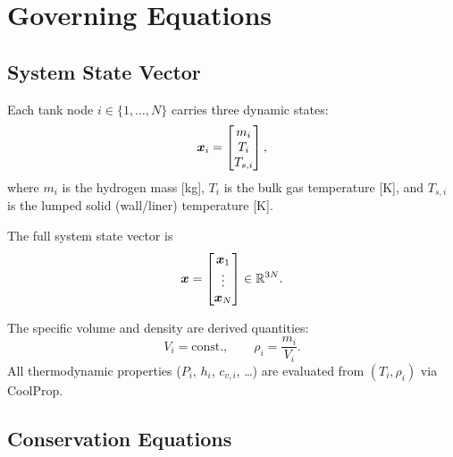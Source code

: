 \section{Governing Equations}
\label{sec:dae}

\subsection{System State Vector}
\label{sec:dae:state}

Each tank node $i \in \{1,\dots,N\}$ carries three dynamic states:
\begin{equation}
  \bm{x}_i = \begin{bmatrix} m_i \\ T_i \\ T_{s,i} \end{bmatrix},
\end{equation}
where $m_i$ is the hydrogen mass [\si{\kilogram}], $T_i$ is the bulk gas
temperature [\si{\kelvin}], and $T_{s,i}$ is the lumped solid (wall/liner)
temperature [\si{\kelvin}].

The full system state vector is
\begin{equation}
  \bm{x} = \begin{bmatrix}
    \bm{x}_1 \\ \vdots \\ \bm{x}_N
  \end{bmatrix} \in \mathbb{R}^{3N}.
\end{equation}

The specific volume and density are derived quantities:
\begin{equation}
  V_i = \text{const.},\qquad
  \rho_i = \frac{m_i}{V_i}.
\end{equation}
All thermodynamic properties ($P_i$, $h_i$, $c_{v,i}$, \dots) are evaluated
from $(T_i, \rho_i)$ via CoolProp.

\subsection{Conservation Equations}
\label{sec:dae:ode}

